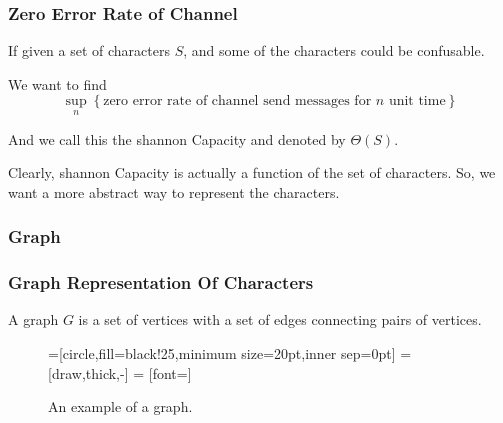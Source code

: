       \begin{frame}
            \frametitle{Zero Error Rate of Channel}
            
            \begin{definition}
                  If given a set of characters $S$, and some of the characters could be confusable.

                  We want to find
                  \begin{equation}
                        \sup_{n} \left\{
                              \text{zero error rate of channel send messages for $n$ unit time}
                        \right\}
                  \end{equation}

                  And we call this the shannon Capacity and denoted by $\Theta(S)$.
            \end{definition}

            Clearly, shannon Capacity is actually a function of the set of characters. So, we want a more abstract way to represent the characters.
      \end{frame}

\subsubsection*{Graph}

\begin{frame}
      \frametitle{Graph Representation Of Characters}
      \begin{definition}[graph] \label{def:graph}
            A graph $ G $ is a set of vertices with a set of edges connecting pairs of vertices.

            \begin{figure}[h!]
                  =[circle,fill=black!25,minimum size=20pt,inner sep=0pt]
                   = [draw,thick,-]
                   = [font=\small]
                  \label{fig:graphDefinitionExample}
                  \caption{An example of a graph.}
            \end{figure}
      \end{definition}
\end{frame}

